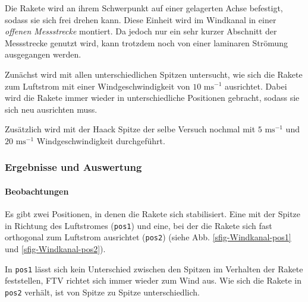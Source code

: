 \documentclass[10pt,a4paper]{article}
\begin{document}
Die Rakete wird an ihrem Schwerpunkt auf einer gelagerten Achse befestigt, sodass sie sich frei drehen kann. Diese Einheit wird im Windkanal in einer \textit{offenen Messstrecke} montiert. Da jedoch nur ein sehr kurzer Abschnitt der Messstrecke genutzt wird, kann trotzdem noch von einer laminaren Strömung ausgegangen werden.

Zunächst wird mit allen unterschiedlichen Spitzen untersucht, wie sich die Rakete zum Luftstrom mit einer Windgeschwindigkeit von $10 \text{ ms}^{-1}$ ausrichtet. Dabei wird die Rakete immer wieder in unterschiedliche Positionen gebracht, sodass sie sich neu ausrichten muss.

Zusätzlich wird mit der Haack Spitze der selbe Versuch nochmal mit $5 \text{ ms}^{-1}$ und $20 \text{ ms}^{-1}$ Windgeschwindigkeit durchgeführt. 


\subsubsection{Ergebnisse und Auswertung}

\paragraph{Beobachtungen}
Es gibt zwei Positionen, in denen die Rakete sich stabilisiert. Eine mit der Spitze in Richtung des Luftstromes (\texttt{pos1}) und eine, bei der die Rakete sich fast orthogonal zum Luftstrom ausrichtet (\texttt{pos2}) (siehe Abb. \ref{sfig-Windkanal-pos1} und \ref{sfig-Windkanal-pos2}).

In \texttt{pos1} lässt sich kein Unterschied zwischen den Spitzen im Verhalten der Rakete feststellen, FTV richtet sich immer wieder zum Wind aus. Wie sich die Rakete in \texttt{pos2} verhält, ist von Spitze zu Spitze unterschiedlich.
\end{document}
